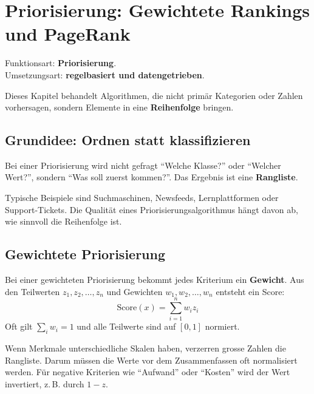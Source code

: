 \chapter{Priorisierung: Gewichtete Rankings und PageRank}
 \label{chap:priorisierung}

\begin{myremark}
Funktionsart: \textbf{Priorisierung}. \\
Umsetzungsart: \textbf{regelbasiert und datengetrieben}.
\end{myremark}

\begin{myremark}
Dieses Kapitel behandelt Algorithmen, die nicht primär Kategorien
oder Zahlen vorhersagen, sondern Elemente in eine \textbf{Reihenfolge} bringen.
\end{myremark}

\section{Grundidee: Ordnen statt klassifizieren}

Bei einer Priorisierung wird nicht gefragt \enquote{Welche Klasse?} oder \enquote{Welcher Wert?},
sondern \enquote{Was soll zuerst kommen?}. Das Ergebnis ist eine \textbf{Rangliste}.

Typische Beispiele sind Suchmaschinen, Newsfeeds, Lernplattformen oder Support-Tickets.
Die Qualität eines Priorisierungsalgorithmus hängt davon ab, wie sinnvoll die Reihenfolge ist.

\section{Gewichtete Priorisierung}

\begin{mydefinition}
Bei einer gewichteten Priorisierung bekommt jedes Kriterium ein \textbf{Gewicht}.
Aus den Teilwerten $z_1, z_2, \ldots, z_n$ und Gewichten $w_1, w_2, \ldots, w_n$ entsteht ein Score:
\[
\text{Score}(x) = \sum_{i=1}^{n} w_i z_i
\]
Oft gilt $\sum_i w_i = 1$ und alle Teilwerte sind auf $[0,1]$ normiert.
\end{mydefinition}

\begin{mycaution}
Wenn Merkmale unterschiedliche Skalen haben, verzerren grosse Zahlen die Rangliste.
Darum müssen die Werte vor dem Zusammenfassen oft normalisiert werden.
Für negative Kriterien wie \enquote{Aufwand} oder \enquote{Kosten} wird der Wert invertiert,
z.\,B. durch $1-z$.
\end{mycaution}

